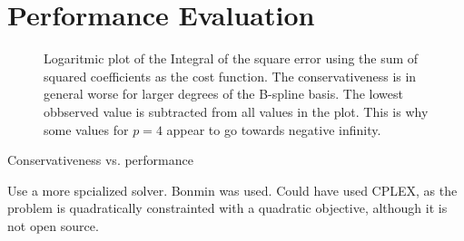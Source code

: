 \section{Performance Evaluation}
\label{sec:performance-evaluation}

\begin{figure}
    \centering
    
    \caption{Logaritmic plot of the Integral of the square error using the sum of squared coefficients as the cost function. The conservativeness is in general worse for larger degrees of the B-spline basis. The lowest obbserved value is subtracted from all values in the plot. This is why some values for $p=4$ appear to go towards negative infinity.}
    \label{fig:conservativeness-coeffs}
\end{figure}

Conservativeness vs. performance

Use a more spcialized solver. Bonmin was used. Could have used CPLEX, as the problem is quadratically constrainted with a quadratic objective, although it is not open source. 